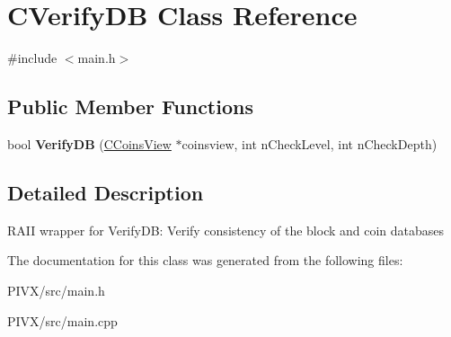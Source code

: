 \hypertarget{class_c_verify_d_b}{}\section{C\+Verify\+DB Class Reference}
\label{class_c_verify_d_b}


{\ttfamily \#include $<$main.\+h$>$}

\subsection*{Public Member Functions}
\begin{DoxyCompactItemize}
\item 
\mbox{\label{class_c_verify_d_b_a5d3e3ade35a14ddce2404e18e4b1df50}} 
bool {\bfseries Verify\+DB} (\mbox{\hyperlink{class_c_coins_view}{C\+Coins\+View}} $\ast$coinsview, int n\+Check\+Level, int n\+Check\+Depth)
\end{DoxyCompactItemize}


\subsection{Detailed Description}
R\+A\+II wrapper for Verify\+DB\+: Verify consistency of the block and coin databases 

The documentation for this class was generated from the following files\+:\begin{DoxyCompactItemize}
\item 
P\+I\+V\+X/src/main.\+h\item 
P\+I\+V\+X/src/main.\+cpp\end{DoxyCompactItemize}
